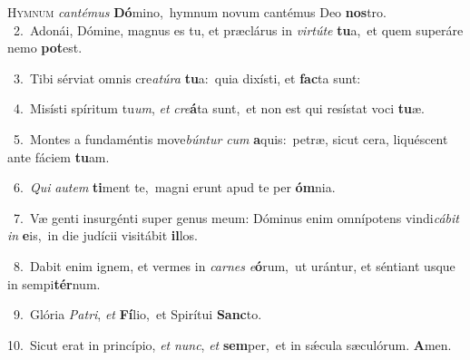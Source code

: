 \lettrine{\initial\textcolor{\initialcolor}{H}}{ymnum} \textit{can}\-\textit{té}\textit{mus} \textbf{Dó}\-mino,~\star hymnum novum cantémus Deo \textbf{nos}\-tro.\\
{\numbfont\textcolor{\numbcolor}{~2.}}~Adonái, Dómine, magnus es tu, et præclárus in \textit{vir}\-\textit{tú}\textit{te} \textbf{tu}\-a,~\star et quem superáre nemo \textbf{pot}\-est.\par
{\numbfont\textcolor{\numbcolor}{~3.}}~Tibi sérviat omnis cre\-\textit{a}\-\textit{tú}\textit{ra} \textbf{tu}\-a:~\star quia dixísti, et \textbf{fac}\-ta sunt:\par
{\numbfont\textcolor{\numbcolor}{~4.}}~Misísti spíritum tu\-\textit{um}\-, \textit{et} \textit{cre}\-\textbf{á}ta sunt,~\star et non est qui resístat voci \textbf{tu}\-æ.\par
{\numbfont\textcolor{\numbcolor}{~5.}}~Montes a fundaméntis move\-\textit{bún}\-\textit{tur} \textit{cum} \textbf{a}\-quis:~\star petræ, sicut cera, liquéscent ante fáciem \textbf{tu}\-am.\par
{\numbfont\textcolor{\numbcolor}{~6.}}~\textit{Qui} \textit{au}\-\textit{tem} \textbf{ti}\-ment te,~\star magni erunt apud te per \textbf{óm}\-nia.\par
{\numbfont\textcolor{\numbcolor}{~7.}}~Væ genti insurgénti super genus meum: Dóminus enim omnípotens vindi\-\textit{cá}\-\textit{bit} \textit{in} \textbf{e}\-is,~\star in die judícii visitábit \textbf{il}\-los.\par
{\numbfont\textcolor{\numbcolor}{~8.}}~Dabit enim ignem, et vermes in \textit{car}\-\textit{nes} \textit{e}\-\textbf{ó}rum,~\star ut urántur, et séntiant usque in sempi\-\textbf{tér}\-num.\par
{\numbfont\textcolor{\numbcolor}{~9.}}~Glória \textit{Pa}\-\textit{tri}, \textit{et} \textbf{Fí}\-lio,~\star et Spirítui \textbf{Sanc}\-to.\par
{\numbfont\textcolor{\numbcolor}{10.}}~Sicut erat in princípio, \textit{et} \textit{nunc}\-, \textit{et} \textbf{sem}\-per,~\star et in sǽcula sæculórum. \textbf{A}\-men.\par
